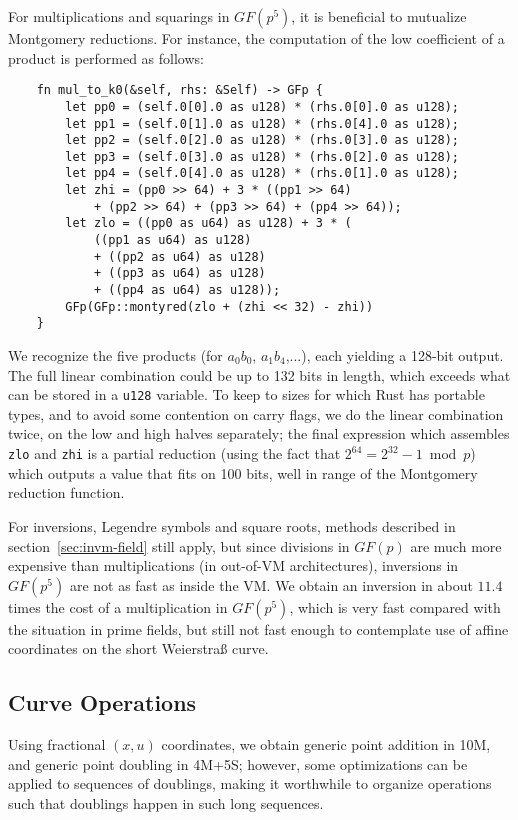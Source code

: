 \documentclass{llncs}
\newcommand{\GF}{GF}
\begin{document}
For multiplications and squarings in $\GF(p^5)$, it is beneficial to
mutualize Montgomery reductions. For instance, the computation of the
low coefficient of a product is performed as follows:
\begin{verbatim}
    fn mul_to_k0(&self, rhs: &Self) -> GFp {
        let pp0 = (self.0[0].0 as u128) * (rhs.0[0].0 as u128);
        let pp1 = (self.0[1].0 as u128) * (rhs.0[4].0 as u128);
        let pp2 = (self.0[2].0 as u128) * (rhs.0[3].0 as u128);
        let pp3 = (self.0[3].0 as u128) * (rhs.0[2].0 as u128);
        let pp4 = (self.0[4].0 as u128) * (rhs.0[1].0 as u128);
        let zhi = (pp0 >> 64) + 3 * ((pp1 >> 64)
            + (pp2 >> 64) + (pp3 >> 64) + (pp4 >> 64));
        let zlo = ((pp0 as u64) as u128) + 3 * (
            ((pp1 as u64) as u128)
            + ((pp2 as u64) as u128)
            + ((pp3 as u64) as u128)
            + ((pp4 as u64) as u128));
        GFp(GFp::montyred(zlo + (zhi << 32) - zhi))
    }
\end{verbatim}

We recognize the five products (for $a_0 b_0$, $a_1 b_4$,...), each
yielding a 128-bit output. The full linear combination could be up to
132 bits in length, which exceeds what can be stored in a \verb+u128+
variable. To keep to sizes for which Rust has portable types, and to
avoid some contention on carry flags, we do the linear combination
twice, on the low and high halves separately; the final expression which
assembles \verb+zlo+ and \verb+zhi+ is a partial reduction (using the
fact that $2^{64} = 2^{32} - 1 \bmod p$) which outputs a value that fits
on 100 bits, well in range of the Montgomery reduction function.

For inversions, Legendre symbols and square roots, methods described
in section~\ref{sec:invm-field} still apply, but since divisions in
$\GF(p)$ are much more expensive than multiplications (in out-of-VM
architectures), inversions in $\GF(p^5)$ are not as fast as inside the
VM. We obtain an inversion in about $11.4$ times the cost of a
multiplication in $\GF(p^5)$, which is very fast compared with the
situation in prime fields, but still not fast enough to contemplate
use of affine coordinates on the short Weierstraß curve.

\subsection{Curve Operations}

Using fractional $(x, u)$ coordinates, we obtain generic point
addition in 10M, and generic point doubling in 4M+5S; however, some
optimizations can be applied to sequences of doublings, making it
worthwhile to organize operations such that doublings happen in such
long sequences.
\end{document}
